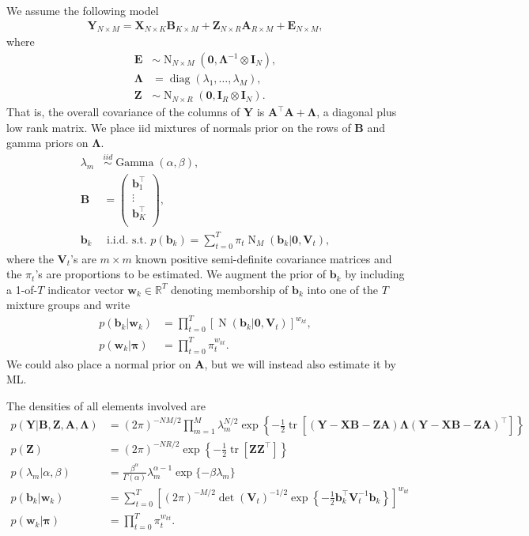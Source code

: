 \documentclass[11pt,authoryear]{article}
\DeclareMathOperator*{\diag}{diag}
\DeclareMathOperator*{\tr}{tr}
\DeclareMathOperator*{\N}{N}
\DeclareMathOperator*{\gm}{Gamma}
\newcommand{\bs}[1]{\boldsymbol{#1}}
\begin{document}
We assume the following model
\begin{align}
\bs{Y}_{N\times M} = \bs{X}_{N \times K}\bs{B}_{K \times M} + \bs{Z}_{N \times R}\bs{A}_{R \times M} + \bs{E}_{N \times M},
\end{align}
where
\begin{align}
\bs{E} &\sim \N_{N \times M}(\bs{0}, \bs{\Lambda}^{-1} \otimes \bs{I}_N),\\
\bs{\Lambda} &= \diag(\lambda_1,\ldots,\lambda_M),\\
\bs{Z} &\sim \N_{N\times R}(\bs{0}, \bs{I}_R \otimes \bs{I}_N).
\end{align}
That is, the overall covariance of the columns of $\bs{Y}$ is
$\bs{A}^{\intercal} \bs{A} + \bs{\Lambda}$, a diagonal plus low rank
matrix. We place iid mixtures of normals prior on the rows of $\bs{B}$
and gamma priors on $\bs{\Lambda}$.
\begin{align}
\lambda_m &\overset{iid}{\sim} \gm(\alpha, \beta),\\
\bs{B} &=
\left(
\begin{array}{c}
\bs{b}_1^\intercal\\
\vdots\\
\bs{b}_K^\intercal\\
\end{array}
\right),\\
\bs{b}_k &\text{ i.i.d. s.t. } p(\bs{b}_k) = \sum_{t = 0}^T\pi_t\N_M(\bs{b}_k | \bs{0}, \bs{V}_t),
\end{align}
where the $\bs{V}_t$'s are $m \times m$ known positive semi-definite
covariance matrices and the $\pi_t$'s are proportions to be
estimated. We augment the prior of $\bs{b}_k$ by including a 1-of-$T$
indicator vector $\bs{w}_k \in \mathbb{R}^{T}$ denoting memborship of
$\bs{b}_k$ into one of the $T$ mixture groups and write
\begin{align}
p(\bs{b}_k|\bs{w}_k) &= \prod_{t = 0}^T\left[\N(\bs{b}_k|\bs{0},\bs{V}_t)\right]^{w_{kt}},\\
p(\bs{w}_k|\bs{\pi}) &= \prod_{t = 0}^T \pi_t^{w_{kt}}.
\end{align}
We could also place a normal prior on $\bs{A}$, but we
will instead also estimate it by ML.

The densities of all elements involved are
\begin{align}
\label{equation:Y.conditional}p(\bs{Y}|\bs{B}, \bs{Z}, \bs{A}, \bs{\Lambda}) &= (2\pi)^{-NM/2} \prod_{m = 1}^M \lambda_m^{N/2} \exp\left\{-\frac{1}{2}\tr\left[(\bs{Y}-\bs{X}\bs{B}-\bs{Z}\bs{A})\bs{\Lambda}(\bs{Y}-\bs{X}\bs{B} - \bs{Z}\bs{A})^{\intercal}\right]\right\}\\
p(\bs{Z}) &= (2\pi)^{-NR/2}\exp\left\{-\frac{1}{2}\tr[\bs{Z}\bs{Z}^{\intercal}]\right\}  \\
p(\lambda_m|\alpha,\beta) &= \frac{\beta^{\alpha}}{\Gamma(\alpha)}\lambda_m^{\alpha - 1}\exp\{-\beta\lambda_m\}\\
p(\bs{b}_k|\bs{w}_k) &= \sum_{t = 0}^{T}\left[(2\pi)^{-M/2}\det(\bs{V}_t)^{-1/2}\exp\left\{-\frac{1}{2}\bs{b}_k^{\intercal}\bs{V}_t^{-1}\bs{b}_k\right\}\right]^{w_{kt}}\\
\label{equation:w.conditional}p(\bs{w}_k|\bs{\pi}) &= \prod_{t = 0}^{T} \pi_t^{w_{kt}}.
\end{align}
\end{document}
